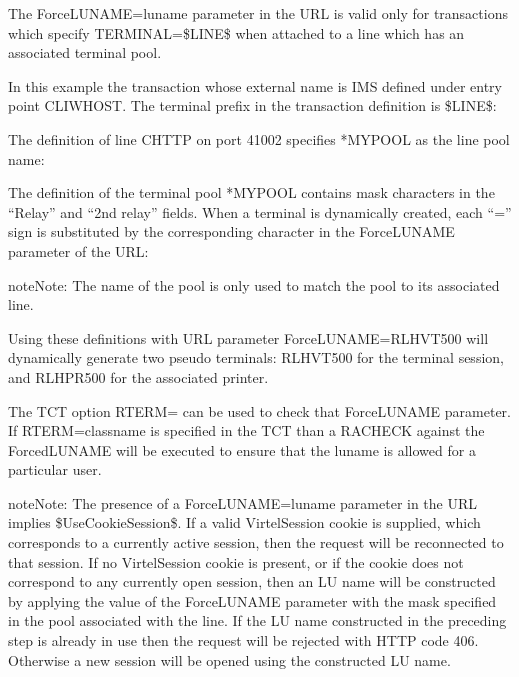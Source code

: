 \documentclass[letterpaper,10pt,english]{sphinxmanual}
\begin{document}
\sphinxAtStartPar
The ForceLUNAME=luname parameter in the URL is valid only for transactions which specify TERMINAL=\$LINE\$ when attached to a line which has an associated terminal pool.

\sphinxAtStartPar
In this example the transaction whose external name is IMS defined under entry point CLIWHOST. The terminal prefix in the transaction definition is \$LINE\$:

\sphinxAtStartPar
{}

\sphinxAtStartPar
The definition of line C\sphinxhyphen{}HTTP on port 41002 specifies *MYPOOL as the line pool name:

\sphinxAtStartPar
{}

\sphinxAtStartPar
The definition of the terminal pool *MYPOOL contains mask characters in the “Relay” and “2nd relay” fields. When a terminal is dynamically created, each “=” sign is substituted by the corresponding character in the ForceLUNAME parameter of the URL:

\sphinxAtStartPar
{}

\begin{sphinxadmonition}{note}{Note:}
\sphinxAtStartPar
The name of the pool is only used to match the pool to its associated line.
\end{sphinxadmonition}

\sphinxAtStartPar
Using these definitions with URL parameter ForceLUNAME=RLHVT500 will dynamically generate two pseudo\sphinxhyphen{} terminals: RLHVT500 for the terminal session, and RLHPR500 for the associated printer.

\sphinxAtStartPar
The TCT option RTERM= can be used to check that ForceLUNAME parameter. If RTERM=classname is specified in the TCT than a RACHECK against the ForcedLUNAME will be executed to ensure that the luname is allowed for a particular user.

\begin{sphinxadmonition}{note}{Note:}
\sphinxAtStartPar
The presence of a ForceLUNAME=luname parameter in the URL implies \$UseCookieSession\$. If a valid VirtelSession cookie is supplied, which corresponds to a currently active session, then the request will be reconnected to that session. If no VirtelSession cookie is present, or if the cookie does not correspond to any currently open session, then an LU name will be constructed by applying the value of the ForceLUNAME parameter with the mask specified in the pool associated with the line. If the LU name constructed in the preceding step is already in use then the request will be rejected with HTTP code 406. Otherwise a new session will be opened using the constructed LU name.
\end{sphinxadmonition}
\end{document}
